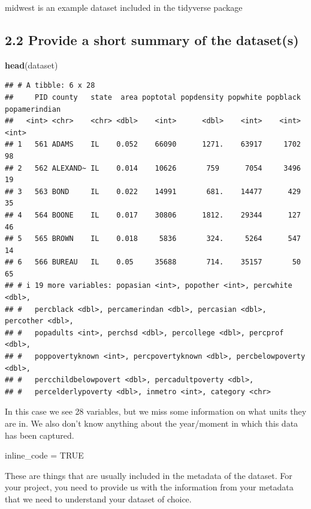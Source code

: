 \documentclass[
]{article}
\newenvironment{Shaded}{\begin{snugshade}}{\end{snugshade}}
\newcommand{\ConstantTok}[1]{\textcolor[rgb]{0.56,0.35,0.01}{#1}}
\newcommand{\FunctionTok}[1]{\textcolor[rgb]{0.13,0.29,0.53}{\textbf{#1}}}
\newcommand{\NormalTok}[1]{#1}
\newcommand{\OtherTok}[1]{\textcolor[rgb]{0.56,0.35,0.01}{#1}}
\begin{document}
midwest is an example dataset included in the tidyverse package

\subsection{2.2 Provide a short summary of the
dataset(s)}\label{provide-a-short-summary-of-the-datasets}

\begin{Shaded}
\begin{Highlighting}[]
\FunctionTok{head}\NormalTok{(dataset)}
\end{Highlighting}
\end{Shaded}

\begin{verbatim}
## # A tibble: 6 x 28
##     PID county   state  area poptotal popdensity popwhite popblack popamerindian
##   <int> <chr>    <chr> <dbl>    <int>      <dbl>    <int>    <int>         <int>
## 1   561 ADAMS    IL    0.052    66090      1271.    63917     1702            98
## 2   562 ALEXAND~ IL    0.014    10626       759      7054     3496            19
## 3   563 BOND     IL    0.022    14991       681.    14477      429            35
## 4   564 BOONE    IL    0.017    30806      1812.    29344      127            46
## 5   565 BROWN    IL    0.018     5836       324.     5264      547            14
## 6   566 BUREAU   IL    0.05     35688       714.    35157       50            65
## # i 19 more variables: popasian <int>, popother <int>, percwhite <dbl>,
## #   percblack <dbl>, percamerindan <dbl>, percasian <dbl>, percother <dbl>,
## #   popadults <int>, perchsd <dbl>, percollege <dbl>, percprof <dbl>,
## #   poppovertyknown <int>, percpovertyknown <dbl>, percbelowpoverty <dbl>,
## #   percchildbelowpovert <dbl>, percadultpoverty <dbl>,
## #   percelderlypoverty <dbl>, inmetro <int>, category <chr>
\end{verbatim}

In this case we see 28 variables, but we miss some information on what
units they are in. We also don't know anything about the year/moment in
which this data has been captured.

\begin{Shaded}
\begin{Highlighting}[]
\NormalTok{inline\_code }\OtherTok{=} \ConstantTok{TRUE}
\end{Highlighting}
\end{Shaded}

These are things that are usually included in the metadata of the
dataset. For your project, you need to provide us with the information
from your metadata that we need to understand your dataset of choice.
\end{document}
